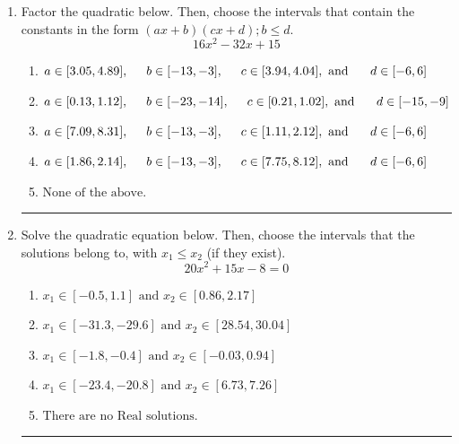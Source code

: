 \documentclass[14pt]{extbook}
\newcommand{\litem}[1]{\item#1\hspace*{-1cm}\rule{\textwidth}{0.4pt}}
\begin{document}
\begin{enumerate}
{\begin{enumerate}[label=\Alph*.]
\end{enumerate} }
\litem{
Factor the quadratic below. Then, choose the intervals that contain the constants in the form $(ax+b)(cx+d); b \leq d.$\[ 16x^{2} -32 x + 15 \]\begin{enumerate}[label=\Alph*.]
\item \( a \in [3.05, 4.89], \hspace*{5mm} b \in [-13, -3], \hspace*{5mm} c \in [3.94, 4.04], \text{ and } \hspace*{5mm} d \in [-6, 6] \)
\item \( a \in [0.13, 1.12], \hspace*{5mm} b \in [-23, -14], \hspace*{5mm} c \in [0.21, 1.02], \text{ and } \hspace*{5mm} d \in [-15, -9] \)
\item \( a \in [7.09, 8.31], \hspace*{5mm} b \in [-13, -3], \hspace*{5mm} c \in [1.11, 2.12], \text{ and } \hspace*{5mm} d \in [-6, 6] \)
\item \( a \in [1.86, 2.14], \hspace*{5mm} b \in [-13, -3], \hspace*{5mm} c \in [7.75, 8.12], \text{ and } \hspace*{5mm} d \in [-6, 6] \)
\item \( \text{None of the above.} \)

\end{enumerate} }
\litem{
Solve the quadratic equation below. Then, choose the intervals that the solutions belong to, with $x_1 \leq x_2$ (if they exist).\[ 20x^{2} +15 x -8 = 0 \]\begin{enumerate}[label=\Alph*.]
\item \( x_1 \in [-0.5, 1.1] \text{ and } x_2 \in [0.86, 2.17] \)
\item \( x_1 \in [-31.3, -29.6] \text{ and } x_2 \in [28.54, 30.04] \)
\item \( x_1 \in [-1.8, -0.4] \text{ and } x_2 \in [-0.03, 0.94] \)
\item \( x_1 \in [-23.4, -20.8] \text{ and } x_2 \in [6.73, 7.26] \)
\item \( \text{There are no Real solutions.} \)


\end{enumerate}}
\end{enumerate}
\end{document}
